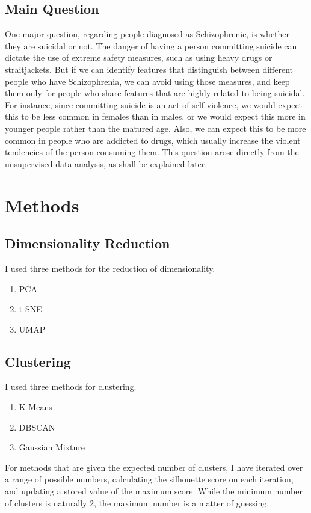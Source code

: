 \documentclass{article}
\begin{document}
\subsection{Main Question}
One major question, regarding people diagnosed as Schizophrenic, is whether they are suicidal or not. The danger of having a person committing suicide can dictate the use of extreme safety measures, such as using heavy drugs or straitjackets. But if we can identify features that distinguish between different people who have Schizophrenia, we can avoid using those measures, and keep them only for people who share features that are highly related to being suicidal. 
For instance, since committing suicide is an act of self-violence, we would expect this to be less common in females than in males, or we would expect this more in younger people rather than the matured age. Also, we can expect this to be more common in people who are addicted to drugs, which usually increase the violent tendencies of the person consuming them.
This question arose directly from the unsupervised data analysis, as shall be explained later.
\section{Methods}
\subsection{Dimensionality Reduction}
I used three methods for the reduction of dimensionality.
\begin{enumerate}
    \item PCA
    \item t-SNE
    \item UMAP
\end{enumerate}

\subsection{Clustering}
I used three methods for clustering.
\begin{enumerate}
    \item K-Means
    \item DBSCAN
    \item Gaussian Mixture
\end{enumerate}

For methods that are given the expected number of clusters, I have iterated over a range of possible numbers, calculating the silhouette score on each iteration, and updating a stored value of the maximum score. While the minimum number of clusters is naturally 2, the maximum number is a matter of guessing.
\end{document}
